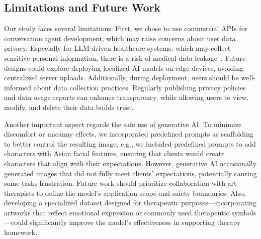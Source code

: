 






\subsection{Limitations and Future Work}
Our study faces several limitations:
First, we chose to use commercial APIs for conversation agent development, which may raise concerns about user data privacy.
Especially for LLM-driven healthcare systems, which may collect sensitive personal information, there is a risk of medical data leakage~\cite{yang2024talk2care}. 
Future designs could explore deploying localized AI models on edge devices, avoiding centralized server uploads. Additionally, during deployment, users should be well-informed about data collection practices. Regularly publishing privacy policies and data usage reports can enhance transparency, while allowing users to view, modify, and delete their data builds trust.

Another important aspect regards the safe use of generative AI. 
To minimize discomfort or uncanny effects, we incorporated predefined prompts as scaffolding to better control the resulting image, e.g., we included predefined prompts to add characters with Asian facial features, ensuring that clients would create characters that align with their expectations.
However, generative AI occasionally generated images that did not fully meet clients' expectations, potentially causing some tasks frustration.
Future work should prioritize collaboration with art therapists to define the model's application scope and safety boundaries. 
Also, developing a specialized dataset designed for therapeutic purposes—incorporating artworks that reflect emotional expression or commonly used therapeutic symbols—could significantly improve the model's effectiveness in supporting therapy homework.

